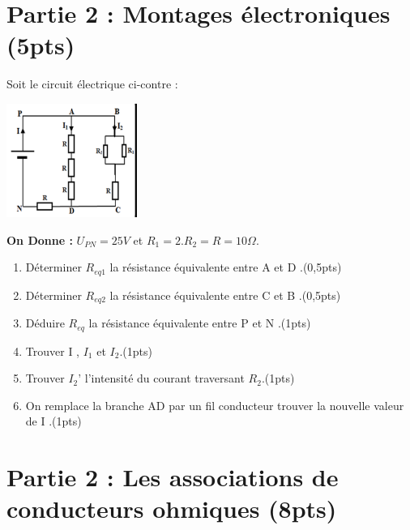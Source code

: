 \documentclass[12pt]{article}
\begin{document}
\section*{Partie 2 : Montages électroniques \dotfill(5pts)}

Soit le circuit électrique ci-contre :
\begin{center}
    \includegraphics[width=0.32\textwidth]{./img/ex00.png}
\end{center}
\textbf{On Donne :} $U_{PN}=25V$ et $R_1=2.R_2=R= 10\Omega$.

\begin{enumerate}
	\item  Déterminer $R_{eq1}$ la résistance équivalente entre A et D .\dotfill (0,5pts)
	\item  Déterminer $R_{eq2}$ la résistance équivalente entre C et B .\dotfill (0,5pts)
	\item Déduire $R_{eq}$ la résistance équivalente entre P et N .\dotfill (1pts)
	\item  Trouver I , $I_1$ et $I_2$.\dotfill (1pts)
	\item  Trouver $I_2’$ l’intensité du courant traversant $R_2$.\dotfill (1pts)
	\item  On remplace la branche AD par un fil conducteur trouver la nouvelle valeur de I .\dotfill (1pts)
\end{enumerate}
\section*{Partie 2 : Les associations de conducteurs ohmiques \dotfill(8pts)}

\end{document}
